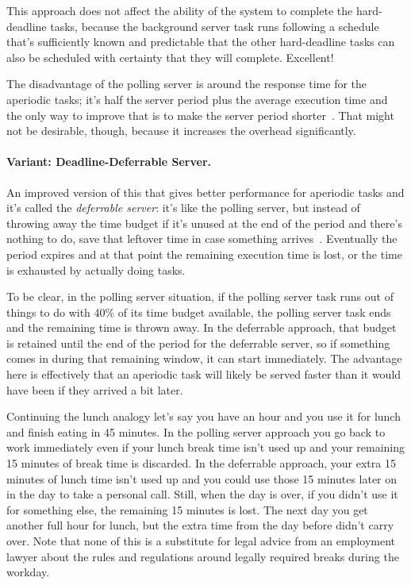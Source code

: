 This approach does not affect the ability of the system to complete the hard-deadline tasks, because the background server task runs following a schedule that's sufficiently known and predictable that the other hard-deadline tasks can also be scheduled with certainty that they will complete. Excellent!

The disadvantage of the polling server is around the response time for the aperiodic tasks; it's half the server period plus the average execution time and the only way to improve that is to make the server period shorter~\cite{aperiodic-server}. That might not be desirable, though, because it increases the overhead significantly. 

\paragraph{Variant: Deadline-Deferrable Server.}
An improved version of this that gives better performance for aperiodic tasks and it's called the \textit{deferrable server}: it's like the polling server, but instead of throwing away the time budget if it's unused at the end of the period and there's nothing to do, save that leftover time in case something arrives~\cite{aperiodic-server}. Eventually the period expires and at that point the remaining execution time is lost, or the time is exhausted by actually doing tasks.

To be clear, in the polling server situation, if the polling server task runs out of things to do with 40\% of its time budget available, the polling server task ends and the remaining time is thrown away. In the deferrable approach, that budget is retained until the end of the period for the deferrable server, so if something comes in during that remaining window, it can start immediately. The advantage here is effectively that an aperiodic task will likely be served faster than it would have been if they arrived a bit later.

Continuing the lunch analogy let's say you have an hour and you use it for lunch and finish eating in 45 minutes. In the polling server approach you go back to work immediately even if your lunch break time isn't used up and your remaining 15 minutes of break time is discarded. In the deferrable approach, your extra 15 minutes of lunch time isn't used up and you could use those 15 minutes later on in the day to take a personal call. Still, when the day is over, if you didn't use it for something else, the remaining 15 minutes is lost. The next day you get another full hour for lunch, but the extra time from the day before didn't carry over. Note that none of this is a substitute for legal advice from an employment lawyer about the rules and regulations around legally required breaks during the workday.

